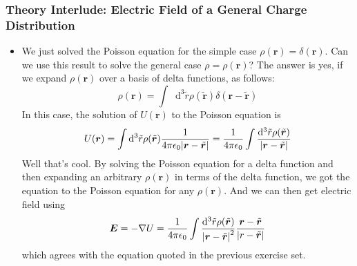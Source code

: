 \documentclass[11pt, a4paper]{article}
\newcommand{\diff}{\mathop{}\!\mathrm{d}} %
\renewcommand{\vec}[1]{\bm{#1}} %
\newcommand{\tvec}[1]{\tilde{\vec{#1}}} %
\renewcommand{\r}{\vec{r}}
\newcommand{\ee}{\epsilon_{0}}  %
\renewcommand{\grad}{\nabla}
\begin{document}
\subsubsection{Theory Interlude: Electric Field of a General Charge Distribution}
\begin{itemize}
	\item We just solved the Poisson equation for the simple case $ \rho(\r) = \delta(\r) $. Can we use this result to solve the general case $ \rho = \rho(\r) $? The answer is yes, if we expand $ \rho(\r) $ over a basis of delta functions, as follows:
	\begin{equation*}
		\rho(\r) = \int \diff^{3}\tilde{r} \rho(\tvec{r}) \delta(\r - \tvec{r})
	\end{equation*}
	In this case, the solution of $ U(\r) $ to the Poisson equation is
	\begin{equation*}
		U(\r) = \int \diff^{3}\tilde{r}\rho(\tvec{r}) \frac{1}{4\pi \ee\abs{\r - \tvec{r}}} = \frac{1}{4\pi \ee} \int\frac{\diff^{3}\tilde{r}\rho(\tvec{r})}{\abs{\r - \tvec{r}}}
	\end{equation*}
	Well that's cool. By solving the Poisson equation for a delta function and then expanding an arbitrary $ \rho(\r) $ in terms of the delta function, we got the equation to the Poisson equation for any $ \rho(\r) $. And we can then get electric field using
	\begin{equation*}
		\vec{E} = - \grad U = \frac{1}{4\pi \ee} \int\frac{\diff^{3}\tilde{r}\rho(\tvec{r})}{\abs{\r - \tvec{r}}^{2}} \frac{\r - \tvec{r}}{\abs{r - \tvec{r}}}
	\end{equation*}
	which agrees with the equation quoted in the previous exercise set.
\end{itemize}
\end{document}
